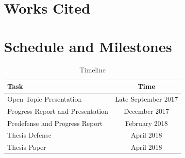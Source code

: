 \documentclass [11pt]{article}
\begin{document}
\section{Works Cited}
\printbibliography

\section{Schedule and Milestones}

\begin{table}[!ht]
	\centering
	\begin{tabular}{l|c}
		Task & Time \\ \hline \hline
		Open Topic Presentation & Late September 2017 \\ \hline
		Progress Report and Presentation & December 2017 \\ \hline
		Predefense and Progress Report & February 2018 \\ \hline
		Thesis Defense & April 2018 \\ \hline
		Thesis Paper & April 2018 \\ \hline
	\end{tabular}
	\caption{Timeline}
\end{table}
\end{document}

